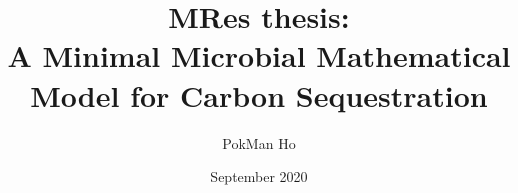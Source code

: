 \documentclass[a4paper,11pt]{article}
\title{MRes thesis:\\A Minimal Microbial Mathematical Model for Carbon Sequestration}
\author{PokMan Ho}
\date{September 2020}
\begin{document}
\maketitle










\nocite{*}\printbibliography
\clearpage

\end{document}
